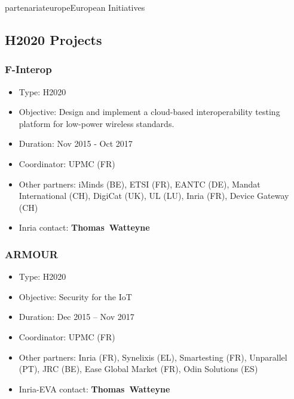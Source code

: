 \documentclass{ra2016}
\newcommand{\thomas}           {\textbf{Thomas~Watteyne}}
\begin{document}
\begin{module}{partenariat}{europe}{European Initiatives}


\subsection{H2020 Projects}

\subsubsection{F-Interop}

\begin{itemize}
    \item Type: H2020
    \item Objective: Design and implement a cloud-based interoperability testing platform for low-power wireless standards.
    \item Duration: Nov 2015 - Oct 2017
    \item Coordinator: UPMC (FR)
    \item Other partners: iMinds (BE), ETSI (FR), EANTC (DE), Mandat International (CH), DigiCat (UK), UL (LU), Inria (FR), Device Gateway (CH)
    \item Inria contact: \thomas
\end{itemize}

\subsubsection{ARMOUR}

\begin{itemize}
    \item Type: H2020
    \item Objective: Security for the IoT
    \item Duration: Dec 2015 – Nov 2017
    \item Coordinator: UPMC (FR)
    \item Other partners: Inria (FR), Synelixis (EL), Smartesting (FR), Unparallel (PT), JRC (BE), Ease Global Market (FR), Odin Solutions (ES)
    \item Inria-EVA contact: \thomas
\end{itemize}


\end{module}
\end{document}
